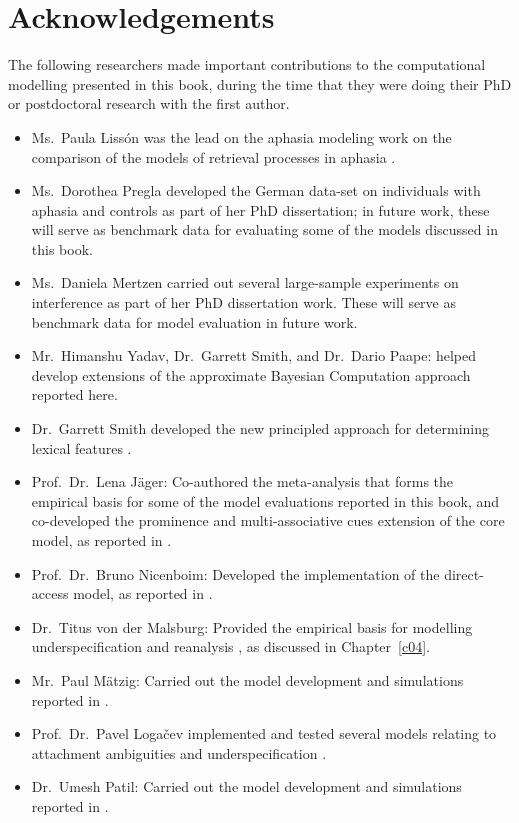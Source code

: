 
\chapter*{Acknowledgements}

The following researchers made important contributions to the  computational modelling presented in this book, during the time that they were doing their PhD or postdoctoral research with the first author.
\begin{itemize}
\item Ms.\ Paula Liss{\'o}n was the lead on the aphasia modeling work on the comparison of the models of retrieval processes in aphasia \citep{LissonEtAl2020}.
\item Ms.\ Dorothea Pregla developed the German data-set on individuals with aphasia and  controls as part of her PhD dissertation; in future work, these will serve as benchmark data for evaluating some of the models discussed in this book.
\item Ms.\ Daniela Mertzen carried out several large-sample experiments on interference as part of her PhD dissertation work.  These will serve as benchmark data for model evaluation in future work.
\item Mr.\ Himanshu Yadav, Dr.\ Garrett Smith, and Dr.\ Dario Paape: helped develop extensions of the approximate Bayesian Computation approach  reported here. 
\item Dr.\ Garrett Smith developed the new principled approach for determining lexical features \citep{smith2019smithvasishthfeatures}. 
\item Prof.\ Dr.\  Lena J\"ager: Co-authored the meta-analysis \citep{JaegerEngelmannVasishth2017} that forms the empirical basis for some of the model evaluations reported in this book, and co-developed the prominence and multi-associative cues extension of the core model, as reported in \cite{EngelmannJaegerVasishth2019}.
\item Prof.\ Dr.\  Bruno  Nicenboim: Developed the implementation of the direct-access model, as reported in \cite{NicenboimRetrieval2018}.
\item Dr.\ Titus von der Malsburg: Provided the empirical  basis for  modelling underspecification and reanalysis \citep{MalsburgVasishth2013}, as discussed in Chapter~\ref{c04}.
 \item Mr.\ Paul M\"atzig: Carried out the model development and simulations reported in \cite{MaetzigEtAltopics2018}.
 \item Prof.\ Dr.\ Pavel Loga{\v c}ev implemented and tested several models relating to attachment ambiguities and underspecification \citep{LogacevMultiple,LogacevVasishthQJEP2016}. 
 \item Dr.\ Umesh Patil: Carried out the model development and simulations reported in \cite{PatilEtAl2016}.
 \end{itemize}

